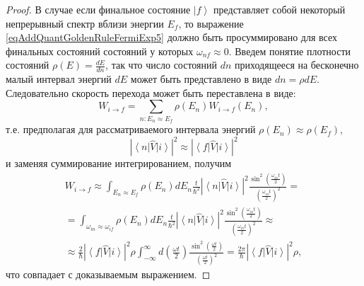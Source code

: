 \begin{proof}
  В случае если финальное состояние $\left|f\right>$ представляет
  собой некоторый непрерывный спектр вблизи энергии $E_f$, то
  выражение \eqref{eqAddQuantGoldenRuleFermiExp5} должно быть
  просуммировано для всех финальных состояний состояний у которых
  $\omega_{nf} \approx 0$. Введем понятие плотности состояний
  $\rho(E) = \frac{dE}{dn}$, так что число состояний $dn$ приходящееся
  на бесконечно малый интервал энергий $dE$ может быть представлено в
  виде $dn = \rho dE$. Следовательно скорость перехода может быть
  переставлена в виде:
  \begin{equation}
    W_{i \rightarrow f} = \sum_{n: E_n \approx E_f}
    \rho\left(E_n\right) W_{i \rightarrow f}\left(E_n\right), 
    \nonumber
  \end{equation}
  т.е. предполагая для рассматриваемого интервала энергий
  $\rho\left(E_n\right) \approx \rho\left(E_f\right)$,
  \[
  \left|\left<n\right|\hat{V}\left|i\right>\right|^2 \approx
  \left|\left<f\right|\hat{V}\left|i\right>\right|^2
  \]
  и заменяя суммирование интегрированием, получим
  \begin{eqnarray}
    W_{i \rightarrow f} \approx
    \int_{E_n \approx E_f} \rho\left(E_n\right) d E_n      \frac{t}{\hbar^2}
    \left|\left<n\right|\hat{V}\left|i\right>\right|^2
    \frac{\sin^2\left(\frac{ \omega_{in} t}{2}\right)}
         {\left(\frac{ \omega_{in} t}{2}\right)^2} =
         \\ \nonumber
         = \int_{\omega_{in} \approx \omega_{if}} \rho\left(E_n\right)
         d E_n      \frac{t}{\hbar^2}
    \left|\left<n\right|\hat{V}\left|i\right>\right|^2
    \frac{\sin^2\left(\frac{ \omega_{in} t}{2}\right)}
         {\left(\frac{ \omega_{in} t}{2}\right)^2} \approx
         \\ \nonumber
    \approx
    \frac{2}{\hbar}
    \left|\left<f\right|\hat{V}\left|i\right>\right|^2 \rho
    \int_{-\infty}^{\infty}
     d \left(\frac{ \omega t}{2}\right)
    \frac{\sin^2\left(\frac{ \omega t}{2}\right)}
         {\left(\frac{ \omega t}{2}\right)^2} =
    \frac{2 \pi}{\hbar} 
    \left|\left<f\right|\hat{V}\left|i\right>\right|^2 \rho,
    \label{eqAddQuantGoldenRuleFermiExp6}
  \end{eqnarray}
  что совпадает с доказываемым выражением.
  
  
\end{proof}
